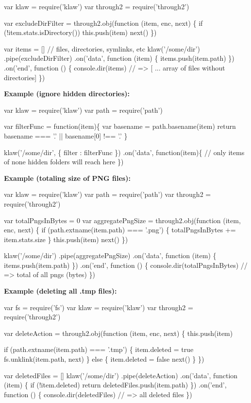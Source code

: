 \begin{DoxyCode}
var klaw = require('klaw')
var through2 = require('through2')

var excludeDirFilter = through2.obj(function (item, enc, next) \{
  if (!item.stats.isDirectory()) this.push(item)
  next()
\})

var items = [] // files, directories, symlinks, etc
klaw('/some/dir')
  .pipe(excludeDirFilter)
  .on('data', function (item) \{
    items.push(item.path)
  \})
  .on('end', function () \{
    console.dir(items) // => [ ... array of files without directories]
  \})
\end{DoxyCode}
 {\bfseries Example (ignore hidden directories)\+:} 
\begin{DoxyCode}
var klaw = require('klaw')
var path = require('path')

var filterFunc = function(item)\{
  var basename = path.basename(item)
  return basename === '.' || basename[0] !== '.'
\}

klaw('/some/dir', \{ filter : filterFunc  \})
  .on('data', function(item)\{
    // only items of none hidden folders will reach here
  \})
\end{DoxyCode}


{\bfseries Example (totaling size of P\+NG files)\+:}


\begin{DoxyCode}
var klaw = require('klaw')
var path = require('path')
var through2 = require('through2')

var totalPngsInBytes = 0
var aggregatePngSize = through2.obj(function (item, enc, next) \{
  if (path.extname(item.path) === '.png') \{
    totalPngsInBytes += item.stats.size
  \}
  this.push(item)
  next()
\})

klaw('/some/dir')
  .pipe(aggregatePngSize)
  .on('data', function (item) \{
    items.push(item.path)
  \})
  .on('end', function () \{
    console.dir(totalPngsInBytes) // => total of all pngs (bytes)
  \})
\end{DoxyCode}


{\bfseries Example (deleting all .tmp files)\+:}


\begin{DoxyCode}
var fs = require('fs')
var klaw = require('klaw')
var through2 = require('through2')

var deleteAction = through2.obj(function (item, enc, next) \{
  this.push(item)

  if (path.extname(item.path) === '.tmp') \{
    item.deleted = true
    fs.unklink(item.path, next)
  \} else \{
    item.deleted = false
    next()
  \}  
\})

var deletedFiles = []
klaw('/some/dir')
  .pipe(deleteAction)
  .on('data', function (item) \{
    if (!item.deleted) return
    deletedFiles.push(item.path)
  \})
  .on('end', function () \{
    console.dir(deletedFiles) // => all deleted files
  \})
\end{DoxyCode}


